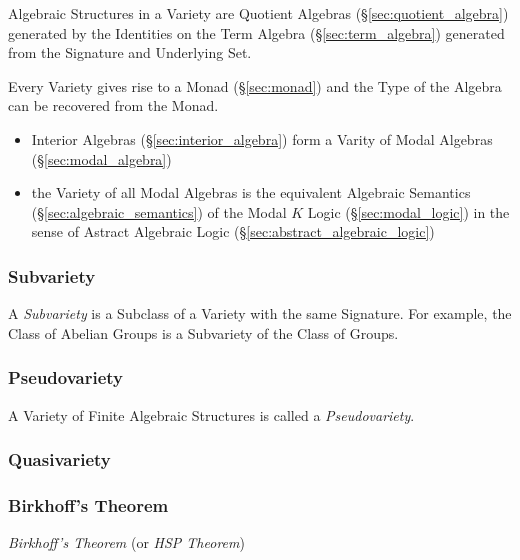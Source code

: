 Algebraic Structures in a Variety are Quotient Algebras
(\S\ref{sec:quotient_algebra}) generated by the Identities on the Term
Algebra (\S\ref{sec:term_algebra}) generated from the Signature and
Underlying Set.

Every Variety gives rise to a Monad (\S\ref{sec:monad}) and the Type
of the Algebra can be recovered from the Monad.

\begin{itemize}
  \item Interior Algebras (\S\ref{sec:interior_algebra}) form a Varity of Modal
    Algebras (\S\ref{sec:modal_algebra})
  \item the Variety of all Modal Algebras is the equivalent Algebraic Semantics
    (\S\ref{sec:algebraic_semantics}) of the Modal $K$ Logic
    (\S\ref{sec:modal_logic}) in the sense of Astract Algebraic Logic
    (\S\ref{sec:abstract_algebraic_logic})
\end{itemize}



\subsubsection{Subvariety}\label{sec:subvariety_theorem}

A \emph{Subvariety} is a Subclass of a Variety with the same
Signature. For example, the Class of Abelian Groups is a Subvariety of
the Class of Groups.



\subsubsection{Pseudovariety}\label{sec:pseudovariety}

A Variety of Finite Algebraic Structures is called a
\emph{Pseudovariety}.



\subsubsection{Quasivariety}\label{sec:quasivariety}



\subsubsection{Birkhoff's Theorem}\label{sec:birkhoffs_theorem}
\cite{birkhoff35}

\emph{Birkhoff's Theorem} (or \emph{HSP Theorem})




